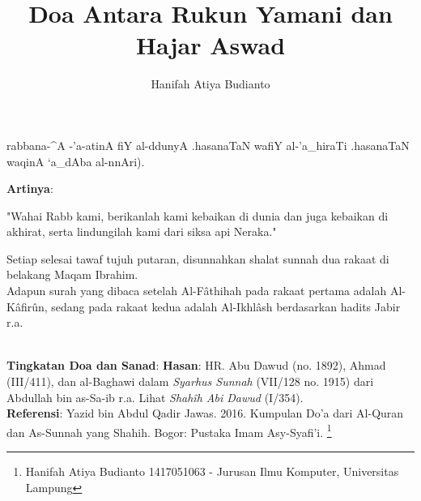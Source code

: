 \documentclass[a4paper,12pt]{article}
\title{\Large Doa Antara Rukun Yamani dan Hajar Aswad}
\author{\calligra Hanifah Atiya Budianto}
\begin{document}
\sffamily
\maketitle 
\fullvocalize
{}
\begin{arabtext}
\noindent
rabbana-^A -'a-atinA fiY al-ddunyA .hasanaTaN wafiY al-'a_hiraTi 
.hasanaTaN waqinA `a_dAba al-nnAri).\\
\end{arabtext}
\noindent
\textbf{Artinya}:
\par
\indent
"Wahai Rabb kami, berikanlah kami kebaikan di dunia dan juga kebaikan di 
akhirat, serta lindungilah kami dari siksa api Neraka."\\
\par
\indent
Setiap selesai tawaf tujuh putaran, disunnahkan shalat sunnah dua rakaat 
di belakang Maqam Ibrahim.\\
\indent
Adapun surah yang dibaca setelah Al-F\^{a}thihah pada rakaat pertama 
adalah Al-K\^{a}fir\^{u}n, sedang pada rakaat kedua adalah Al-Ikhl\^{a}sh 
berdasarkan hadits Jabir r.a.\\\\
\par
\noindent
\textbf{Tingkatan Doa dan Sanad}: \textbf{Hasan}: HR. Abu Dawud (no. 1892),
Ahmad (III/411), dan al-Baghawi dalam \textit{Syarhus Sunnah} (VII/128 no. 
1915) dari Abdullah bin as-Sa-ib r.a. Lihat \textit{Shah\^{i}h Abi Dawud} 
(I/354).\\
\textbf{Referensi}: Yazid bin Abdul Qadir Jawas. 2016. Kumpulan Do'a dari
Al-Quran dan As-Sunnah yang Shahih. Bogor: Pustaka Imam Asy-Syafi'i.
\footnote{Hanifah Atiya Budianto 1417051063 - Jurusan Ilmu Komputer,
Universitas Lampung}
\end{document}
